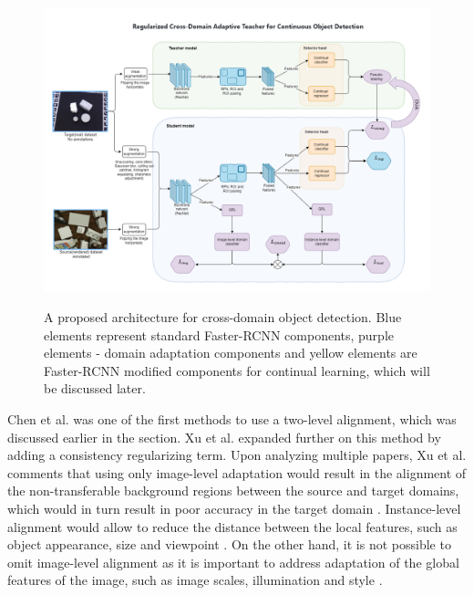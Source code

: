 \begin{figure}[htb]
	\begin{center}
		\includegraphics[width=16cm]{./MyModel.png}
	\end{center}
	\caption{A proposed architecture for cross-domain object detection. Blue elements represent standard Faster-RCNN components, purple elements - domain adaptation components and yellow elements are Faster-RCNN modified components for continual learning, which will be discussed later.}
	\begin{center}
		\label{mymodel}
	\end{center}
\end{figure}
\FloatBarrier

Chen et al. \cite{Chen2018} was one of the first methods to use a two-level alignment, which was discussed earlier in the  section. Xu et al. \cite{Xu2020} expanded further on this method by adding a consistency regularizing term. Upon analyzing multiple papers, Xu et al. comments that using only image-level adaptation would result in the alignment of the non-transferable background regions between the source and target domains, which would in turn result in poor accuracy in the target domain \cite{Xu2020}. Instance-level alignment would allow to reduce the distance between the local features, such as object appearance, size and viewpoint \cite{Chen2018}. On the other hand, it is not possible to omit image-level alignment as it is important to address adaptation of the global features of the image, such as image scales, illumination and style \cite{Chen2018}. 

